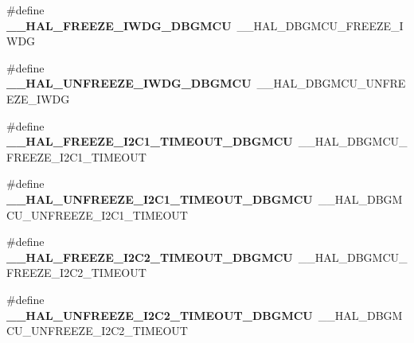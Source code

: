 \begin{DoxyCompactItemize}
\item 
\hypertarget{group___h_a_l___d_b_g_m_c_u___aliased___macros_ga683080f08b123e73ee801508fac33188}{\#define {\bfseries \-\_\-\-\_\-\-H\-A\-L\-\_\-\-F\-R\-E\-E\-Z\-E\-\_\-\-I\-W\-D\-G\-\_\-\-D\-B\-G\-M\-C\-U}~\-\_\-\-\_\-\-H\-A\-L\-\_\-\-D\-B\-G\-M\-C\-U\-\_\-\-F\-R\-E\-E\-Z\-E\-\_\-\-I\-W\-D\-G}\label{group___h_a_l___d_b_g_m_c_u___aliased___macros_ga683080f08b123e73ee801508fac33188}

\item 
\hypertarget{group___h_a_l___d_b_g_m_c_u___aliased___macros_ga73aaa0abfab57e061c9e64ee39f5e3c8}{\#define {\bfseries \-\_\-\-\_\-\-H\-A\-L\-\_\-\-U\-N\-F\-R\-E\-E\-Z\-E\-\_\-\-I\-W\-D\-G\-\_\-\-D\-B\-G\-M\-C\-U}~\-\_\-\-\_\-\-H\-A\-L\-\_\-\-D\-B\-G\-M\-C\-U\-\_\-\-U\-N\-F\-R\-E\-E\-Z\-E\-\_\-\-I\-W\-D\-G}\label{group___h_a_l___d_b_g_m_c_u___aliased___macros_ga73aaa0abfab57e061c9e64ee39f5e3c8}

\item 
\hypertarget{group___h_a_l___d_b_g_m_c_u___aliased___macros_ga6e04cdfbd0408018f712455198c8120b}{\#define {\bfseries \-\_\-\-\_\-\-H\-A\-L\-\_\-\-F\-R\-E\-E\-Z\-E\-\_\-\-I2\-C1\-\_\-\-T\-I\-M\-E\-O\-U\-T\-\_\-\-D\-B\-G\-M\-C\-U}~\-\_\-\-\_\-\-H\-A\-L\-\_\-\-D\-B\-G\-M\-C\-U\-\_\-\-F\-R\-E\-E\-Z\-E\-\_\-\-I2\-C1\-\_\-\-T\-I\-M\-E\-O\-U\-T}\label{group___h_a_l___d_b_g_m_c_u___aliased___macros_ga6e04cdfbd0408018f712455198c8120b}

\item 
\hypertarget{group___h_a_l___d_b_g_m_c_u___aliased___macros_gae0a68ca652c73463c72c0d6f164ef675}{\#define {\bfseries \-\_\-\-\_\-\-H\-A\-L\-\_\-\-U\-N\-F\-R\-E\-E\-Z\-E\-\_\-\-I2\-C1\-\_\-\-T\-I\-M\-E\-O\-U\-T\-\_\-\-D\-B\-G\-M\-C\-U}~\-\_\-\-\_\-\-H\-A\-L\-\_\-\-D\-B\-G\-M\-C\-U\-\_\-\-U\-N\-F\-R\-E\-E\-Z\-E\-\_\-\-I2\-C1\-\_\-\-T\-I\-M\-E\-O\-U\-T}\label{group___h_a_l___d_b_g_m_c_u___aliased___macros_gae0a68ca652c73463c72c0d6f164ef675}

\item 
\hypertarget{group___h_a_l___d_b_g_m_c_u___aliased___macros_ga2877e6a523cce3f5d72e9fcb746db130}{\#define {\bfseries \-\_\-\-\_\-\-H\-A\-L\-\_\-\-F\-R\-E\-E\-Z\-E\-\_\-\-I2\-C2\-\_\-\-T\-I\-M\-E\-O\-U\-T\-\_\-\-D\-B\-G\-M\-C\-U}~\-\_\-\-\_\-\-H\-A\-L\-\_\-\-D\-B\-G\-M\-C\-U\-\_\-\-F\-R\-E\-E\-Z\-E\-\_\-\-I2\-C2\-\_\-\-T\-I\-M\-E\-O\-U\-T}\label{group___h_a_l___d_b_g_m_c_u___aliased___macros_ga2877e6a523cce3f5d72e9fcb746db130}

\item 
\hypertarget{group___h_a_l___d_b_g_m_c_u___aliased___macros_ga7f8561c59b23e6157a2a4854bfd7a152}{\#define {\bfseries \-\_\-\-\_\-\-H\-A\-L\-\_\-\-U\-N\-F\-R\-E\-E\-Z\-E\-\_\-\-I2\-C2\-\_\-\-T\-I\-M\-E\-O\-U\-T\-\_\-\-D\-B\-G\-M\-C\-U}~\-\_\-\-\_\-\-H\-A\-L\-\_\-\-D\-B\-G\-M\-C\-U\-\_\-\-U\-N\-F\-R\-E\-E\-Z\-E\-\_\-\-I2\-C2\-\_\-\-T\-I\-M\-E\-O\-U\-T}\label{group___h_a_l___d_b_g_m_c_u___aliased___macros_ga7f8561c59b23e6157a2a4854bfd7a152}


\end{DoxyCompactItemize}
